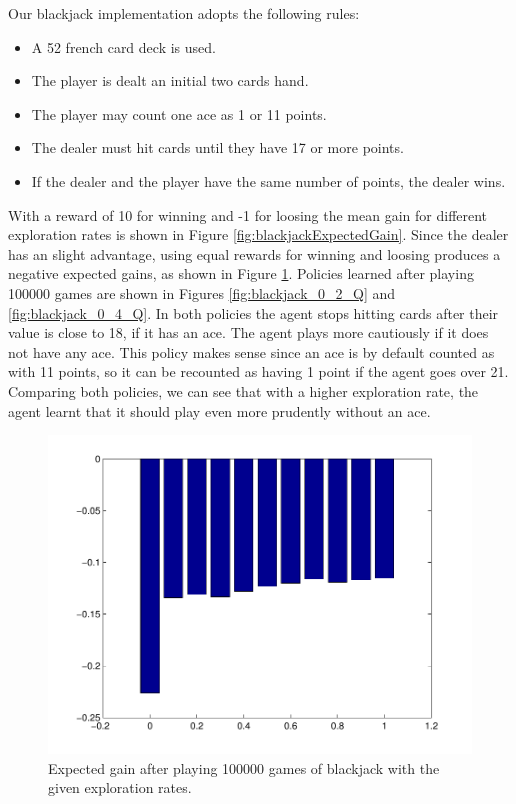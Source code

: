 \documentclass[12pt]{article}
\begin{document}
Our blackjack implementation adopts the following rules:

\begin{itemize}
  \item A 52 french card deck is used.
  \item The player is dealt an initial two cards hand.
  \item The player may count one ace as 1 or 11 points.
  \item The dealer must hit cards until they have 17 or more points.
  \item If the dealer and the player have the same number of points, the dealer wins.
\end{itemize}

With a reward of 10 for winning and -1 for loosing the mean gain for different exploration rates is shown in  Figure \ref{fig:blackjackExpectedGain}.
Since the dealer has an slight advantage, using equal rewards for winning and loosing produces a negative expected gains, as shown in Figure \ref{fig:blackjackExpectedGain1}.
Policies learned after playing 100000 games are shown in Figures \ref{fig:blackjack_0_2_Q} and \ref{fig:blackjack_0_4_Q}.
In both policies the agent stops hitting cards after their value is close to 18, if it has an ace.
The agent plays more cautiously if it does not have any ace.
This policy makes sense since an ace is by default counted as with 11 points, so it can be recounted as having 1 point if the agent goes over 21.
Comparing both policies, we can see that with a higher exploration rate, the agent learnt that it should play even more prudently without an ace.

\begin{figure}[btph!]
\centering
	\includegraphics[scale=0.4]{images/blackjackExpectedGain1}
	\caption{Expected gain after playing 100000 games of blackjack with the given exploration rates.}
	\label{fig:blackjackExpectedGain1}
\end{figure}
\end{document}
